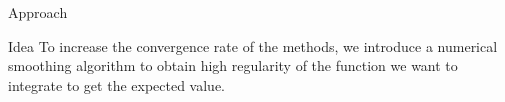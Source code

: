 \begin{frame}{Approach}
	
	\begin{block}{Idea}
		To increase the convergence rate of the methods, we introduce a numerical smoothing algorithm to obtain high regularity of the function we want to integrate to get the expected value. 
	\end{block}
\end{frame}